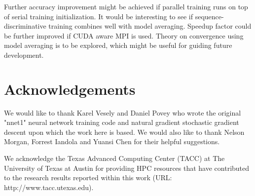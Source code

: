 \documentclass{article}
\begin{document}
Further accuracy improvement might be achieved if parallel training runs on top of serial training initialization.
It would be interesting to see if sequence-discriminative training combines well with model averaging.
Speedup factor could be further improved if CUDA aware MPI is used. Theory on convergence using model averaging is 
to be explored, which might be useful for guiding future development.

\section{Acknowledgements}
We would like to thank Karel Vesely and Daniel Povey who wrote the original "nnet1" neural network training code
and natural gradient stochastic gradient descent upon which the work here is based. We would also like to thank Nelson 
Morgan, Forrest Iandola and Yuansi Chen for their helpful suggestions. 

We acknowledge the Texas Advanced Computing Center (TACC) at The University of Texas at Austin for providing 
HPC resources that have contributed to the research results reported within this work (URL: http://www.tacc.utexas.edu).




\end{document}

